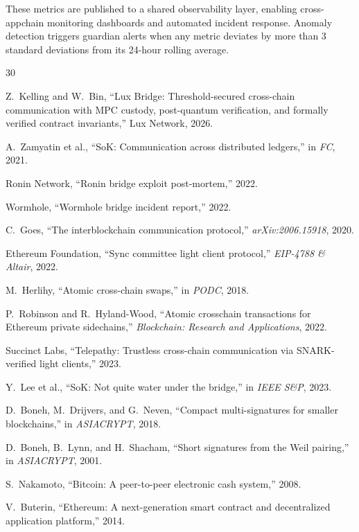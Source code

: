 \documentclass[11pt,a4paper]{article}
\begin{document}
These metrics are published to a shared observability layer, enabling cross-appchain monitoring dashboards and automated incident response. Anomaly detection triggers guardian alerts when any metric deviates by more than 3 standard deviations from its 24-hour rolling average.


\begin{thebibliography}{30}

Z.~Kelling and W.~Bin, ``Lux Bridge: Threshold-secured cross-chain communication with MPC custody, post-quantum verification, and formally verified contract invariants,'' Lux Network, 2026.

A.~Zamyatin et al., ``SoK: Communication across distributed ledgers,'' in \emph{FC}, 2021.

Ronin Network, ``Ronin bridge exploit post-mortem,'' 2022.

Wormhole, ``Wormhole bridge incident report,'' 2022.

C.~Goes, ``The interblockchain communication protocol,'' \emph{arXiv:2006.15918}, 2020.

Ethereum Foundation, ``Sync committee light client protocol,'' \emph{EIP-4788 \& Altair}, 2022.

M.~Herlihy, ``Atomic cross-chain swaps,'' in \emph{PODC}, 2018.

P.~Robinson and R.~Hyland-Wood, ``Atomic crosschain transactions for Ethereum private sidechains,'' \emph{Blockchain: Research and Applications}, 2022.

Succinct Labs, ``Telepathy: Trustless cross-chain communication via SNARK-verified light clients,'' 2023.

Y.~Lee et al., ``SoK: Not quite water under the bridge,'' in \emph{IEEE S\&P}, 2023.

D.~Boneh, M.~Drijvers, and G.~Neven, ``Compact multi-signatures for smaller blockchains,'' in \emph{ASIACRYPT}, 2018.

D.~Boneh, B.~Lynn, and H.~Shacham, ``Short signatures from the Weil pairing,'' in \emph{ASIACRYPT}, 2001.

S.~Nakamoto, ``Bitcoin: A peer-to-peer electronic cash system,'' 2008.

V.~Buterin, ``Ethereum: A next-generation smart contract and decentralized application platform,'' 2014.


\end{thebibliography}
\end{document}
